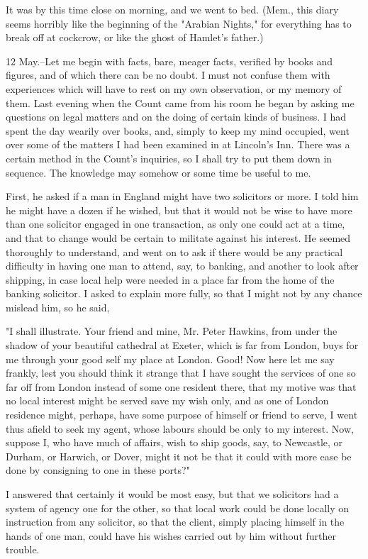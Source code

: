 It was by this time close on morning, and we went to bed. (Mem., this diary seems horribly like the beginning of the "Arabian Nights," for everything has to break off at cockcrow, or like the ghost of Hamlet's father.) 

12 May.--Let me begin with facts, bare, meager facts, verified by books and figures, and of which there can be no doubt. I must not confuse them with experiences which will have to rest on my own observation, or my memory of them. Last evening when the Count came from his room he began by asking me questions on legal matters and on the doing of certain kinds of business. I had spent the day wearily over books, and, simply to keep my mind occupied, went over some of the matters I had been examined in at Lincoln's Inn. There was a certain method in the Count's inquiries, so I shall try to put them down in sequence. The knowledge may somehow or some time be useful to me. 

First, he asked if a man in England might have two solicitors or more. I told him he might have a dozen if he wished, but that it would not be wise to have more than one solicitor engaged in one transaction, as only one could act at a time, and that to change would be certain to militate against his interest. He seemed thoroughly to understand, and went on to ask if there would be any practical difficulty in having one man to attend, say, to banking, and another to look after shipping, in case local help were needed in a place far from the home of the banking solicitor. I asked to explain more fully, so that I might not by any chance mislead him, so he said, 

"I shall illustrate. Your friend and mine, Mr. Peter Hawkins, from under the shadow of your beautiful cathedral at Exeter, which is far from London, buys for me through your good self my place at London. Good! Now here let me say frankly, lest you should think it strange that I have sought the services of one so far off from London instead of some one resident there, that my motive was that no local interest might be served save my wish only, and as one of London residence might, perhaps, have some purpose of himself or friend to serve, I went thus afield to seek my agent, whose labours should be only to my interest. Now, suppose I, who have much of affairs, wish to ship goods, say, to Newcastle, or Durham, or Harwich, or Dover, might it not be that it could with more ease be done by consigning to one in these ports?" 

I answered that certainly it would be most easy, but that we solicitors had a system of agency one for the other, so that local work could be done locally on instruction from any solicitor, so that the client, simply placing himself in the hands of one man, could have his wishes carried out by him without further trouble. 

